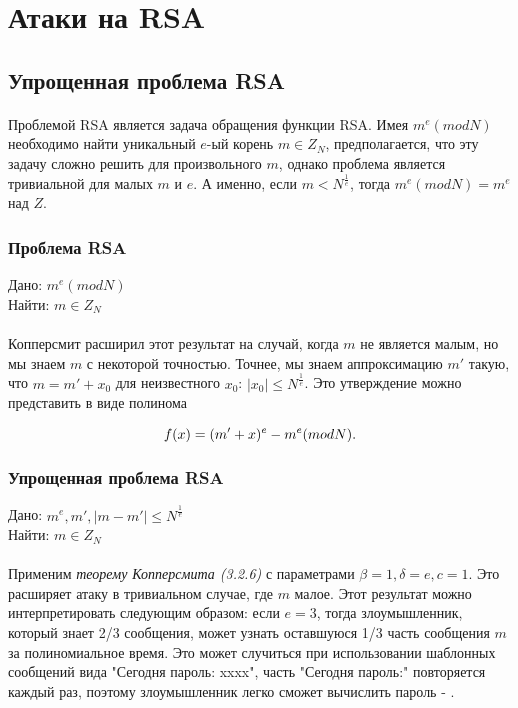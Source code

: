 \section{Атаки на RSA}

\subsection{Упрощенная проблема RSA}

\paragraph{} Проблемой RSA является задача обращения функции RSA. Имея {$m^e (mod N)$} необходимо найти уникальный {$e$}-ый корень {$m \in Z_N$}, 
  предполагается, что эту задачу сложно решить для произвольного {$m$}, однако проблема является тривиальной для малых {$m$} и {$e$}. А именно, если
  {$m < N^\frac{1}{e}$}, тогда {$m^e (mod N) = m^e$} над {$Z$}.
  
  \subsubsection{Проблема RSA}
  Дано: {$m^e (mod N)$} \\   
  Найти: {$m \in Z_N$}
  
\paragraph{} Копперсмит расширил этот результат на случай, когда {$m$} не является малым, но мы знаем {$m$} с некоторой точностью. Точнее, мы знаем аппроксимацию
  {$m'$} такую, что {$m = m' + x_0$} для неизвестного {$x_0$}: {$|x_0| \le N^\frac{1}{e}$}. Это утверждение можно представить в виде полинома
  
    \begin{equation}
     \textit{{$ f(x) = (m' + x)^e - m^e (mod N) $}}.
    \end{equation}
    
  \subsubsection{Упрощенная проблема RSA}
  Дано: {$m^e, m', |m-m'| \le N^\frac{1}{e}$} \\   
  Найти: {$m \in Z_N$}  
  
\paragraph{} Применим \textit{теорему Копперсмита (3.2.6)} с параметрами {$\beta = 1, \delta = e, c = 1$}. Это расширяет атаку в тривиальном случае, где {$m$} малое. Этот
  результат можно интерпретировать следующим образом: если {$e = 3$}, тогда злоумышленник, который знает 2/3 сообщения, может узнать оставшуюся
  1/3 часть сообщения {$m$} за полиномиальное время. Это может случиться при использовании шаблонных сообщений вида "Сегодня пароль: xxxx", часть 
  "Сегодня пароль:" повторяется каждый раз, поэтому злоумышленник легко сможет вычислить пароль - \cite[страницы 328-329]{may10}.
